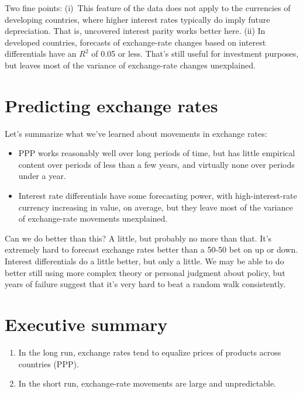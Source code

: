 Two fine points:  (i)~This feature of the data does not apply to
the currencies of developing countries, where higher interest rates
typically do imply future depreciation.
That is, uncovered interest parity works better here.
(ii) In developed countries, forecasts of exchange-rate changes based on interest differentials have an $R^2$ of 0.05 or less.
That's still useful for investment purposes,
but leaves most of the variance of exchange-rate changes unexplained.


\section{Predicting exchange rates}

Let's summarize what we've learned about movements in exchange rates:
%
\begin{itemize}
\item PPP works reasonably well over long periods of time,
but has little empirical content over periods of less than a few years,
and virtually none over periods under a year.

\item Interest rate differentials have some forecasting power,
with high-interest-rate currency increasing in value, on average,
but they leave most of the variance of exchange-rate movements
 unexplained.
\end{itemize}
%
Can we do better than this?
A little, but probably no more than that.
It's extremely hard to forecast exchange rates better than
a 50-50 bet on up or down.
Interest differentials do a little better, but only a little. We may be able to do better still
using more complex theory or personal judgment about policy,
but years of failure suggest that
it's very hard to beat a random walk consistently.



\section*{Executive summary}

\setlength{\leftmargini}{.5\oldleftmargini}
\begin{enumerate}
\item In the long run, exchange rates tend to
equalize prices of products across countries (PPP).

\item In the short run, exchange-rate movements are large
and unpredictable.
\end{enumerate}
\setlength{\leftmargini}{\oldleftmargini}

